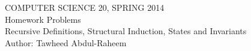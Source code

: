 \documentclass[12pt]{article}
\begin{document}
\begin{center}
COMPUTER SCIENCE 20, SPRING 2014 \\
Homework Problems\\
Recursive Definitions, Structural Induction, States and Invariants\\
Author: Tawheed Abdul-Raheem
\end{center}

\smallskip

\end{document}
